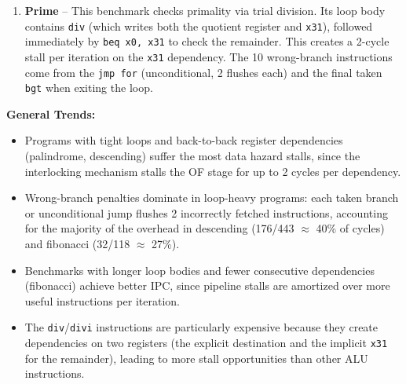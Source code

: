 \documentclass[12pt]{article}
\begin{document}
\begin{enumerate}[leftmargin=*]
\item \textbf{Prime} -- This benchmark checks primality via trial division. Its loop body contains \texttt{div} (which writes both the quotient register and \texttt{x31}), followed immediately by \texttt{beq x0, x31} to check the remainder. This creates a 2-cycle stall per iteration on the \texttt{x31} dependency. The 10 wrong-branch instructions come from the \texttt{jmp for} (unconditional, 2 flushes each) and the final taken \texttt{bgt} when exiting the loop.

\end{enumerate}

\noindent\textbf{General Trends:}
\begin{itemize}[leftmargin=*]
    \item Programs with tight loops and back-to-back register dependencies (palindrome, descending) suffer the most data hazard stalls, since the interlocking mechanism stalls the OF stage for up to 2 cycles per dependency.
    \item Wrong-branch penalties dominate in loop-heavy programs: each taken branch or unconditional jump flushes 2 incorrectly fetched instructions, accounting for the majority of the overhead in descending (176/443 $\approx$ 40\% of cycles) and fibonacci (32/118 $\approx$ 27\%).
    \item Benchmarks with longer loop bodies and fewer consecutive dependencies (fibonacci) achieve better IPC, since pipeline stalls are amortized over more useful instructions per iteration.
    \item The \texttt{div}/\texttt{divi} instructions are particularly expensive because they create dependencies on two registers (the explicit destination and the implicit \texttt{x31} for the remainder), leading to more stall opportunities than other ALU instructions.
\end{itemize}
\end{document}
